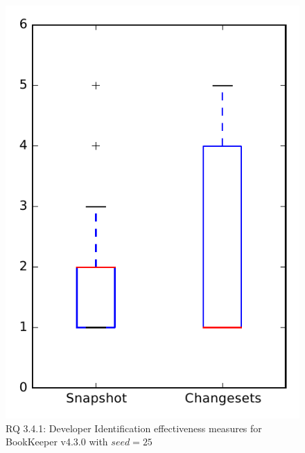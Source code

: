 
\begin{figure}
\centering
\includegraphics[height=0.4\textheight]{figures/dit_seed/rq1_bookkeeper_25}
\caption{RQ 3.4.1: Developer Identification effectiveness measures for BookKeeper v4.3.0 with $seed=25$}
\label{fig:dit_seed:rq1:bookkeeper}
\end{figure}
